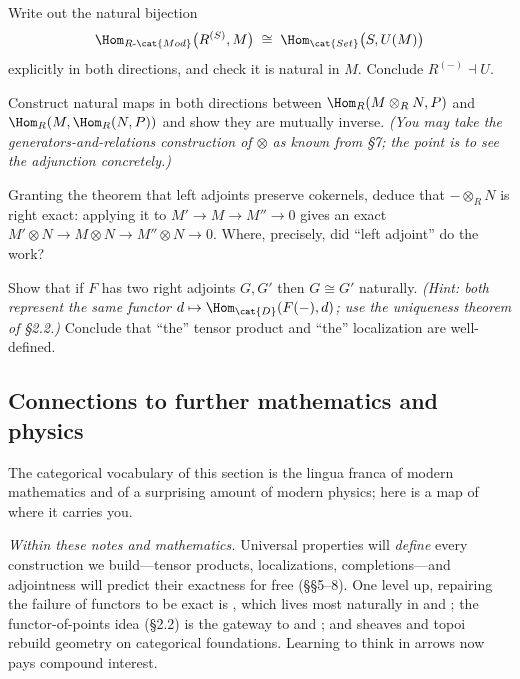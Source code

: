 \documentclass[11pt]{article}
\begin{document}
\begin{xca}
Write out the natural bijection
\[
\Hom_{R\text{-}\cat{Mod}}\big(R^{(S)},M\big)\;\cong\;\Hom_{\cat{Set}}\big(S,U(M)\big)
\]
explicitly in both directions, and check it is natural in $M$. Conclude $R^{(-)}\dashv U$.
\end{xca}

\begin{xca}
Construct natural maps in both directions between $\Hom_R(M\otimes_R N,P)$ and
$\Hom_R(M,\Hom_R(N,P))$ and show they are mutually inverse. \emph{(You may take the
generators-and-relations construction of $\otimes$ as known from \S7; the point is to see the
adjunction concretely.)}
\end{xca}

\begin{xca}
Granting the theorem that left adjoints preserve cokernels, deduce that $-\otimes_R N$ is
right exact: applying it to $M'\to M\to M''\to 0$ gives an exact
$M'\otimes N\to M\otimes N\to M''\otimes N\to 0$. Where, precisely, did ``left adjoint'' do
the work?
\end{xca}

\begin{xca}
Show that if $F$ has two right adjoints $G,G'$ then $G\cong G'$ naturally. \emph{(Hint: both
represent the same functor $d\mapsto\Hom_{\cat{D}}(F(-),d)$; use the uniqueness theorem of
\S2.2.)} Conclude that ``the'' tensor product and ``the'' localization are well-defined.
\end{xca}

\subsection{Connections to further mathematics and physics}

The categorical vocabulary of this section is the lingua franca of modern mathematics and of a
surprising amount of modern physics; here is a map of where it carries you.

\emph{Within these notes and mathematics.} Universal properties will \emph{define} every
construction we build---tensor products, localizations, completions---and adjointness will
predict their exactness for free (\S\S5--8). One level up, repairing the failure of functors to
be exact is , which lives most naturally in  and
; the functor-of-points idea (\S2.2) is the gateway to
 and ; and sheaves and topoi rebuild geometry on categorical
foundations. Learning to think in arrows now pays compound interest.
\end{document}
